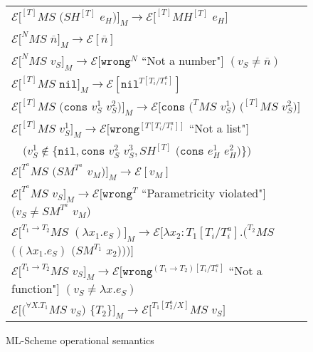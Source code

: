 \begin{figure}[p]
\centering
\begin{tabular}{l}
$\mathscr{E}[^{[T]}MS$ $(SH^{[T]}$ $e_{H})]_{M}\rightarrow\mathscr{E}[^{[T]}MH^{[T]}$ $e_{H}]$ \\
$\mathscr{E}[^{N}MS$ $\overline{n}]_{M}\rightarrow\mathscr{E}[\overline{n}]$ \\
$\mathscr{E}[^{N}MS$ $v_{S}]_{M}\rightarrow\mathscr{E}[\mathtt{wrong}^{N}$ ``Not a number"$]$ $(v_{S}\neq\overline{n})$ \\
$\mathscr{E}[^{[T]}MS$ $\mathtt{nil}]_{M}\rightarrow\mathscr{E}[\mathtt{nil}^{T[T_{i}/T_{i}^{a}]}]$ \\
$\mathscr{E}[^{[T]}MS$ $(\mathtt{cons}$ $v_{S}^{1}$ $v_{S}^{2})]_{M}\rightarrow\mathscr{E}[\mathtt{cons}$ $(^{T}MS$ $v_{S}^{1})$ $(^{[T]}MS$ $v_{S}^{2})]$ \\
$\mathscr{E}[^{[T]}MS$ $v_{S}^{1}]_{M}\rightarrow\mathscr{E}[\mathtt{wrong}^{[T[T_{i}/T_{i}^{a}]]}$ ``Not a list"$]$ \\
$\quad(v_{S}^{1}\not\in\lbrace\mathtt{nil},\mathtt{cons}$ $v_{S}^{2}$ $v_{S}^{3},SH^{[T]}$ $(\mathtt{cons}$ $e_{H}^{1}$ $e_{H}^{2})\rbrace)$ \\
$\mathscr{E}[^{T^{a}}MS$ $(SM^{T^{a}}$ $v_{M})]_{M}\rightarrow\mathscr{E}[v_{M}]$ \\
$\mathscr{E}[^{T^{a}}MS$ $v_{S}]_{M}\rightarrow\mathscr{E}[\mathtt{wrong}^{T}$ ``Parametricity violated"$]$ $(v_{S}\neq SM^{T^{a}}$ $v_{M})$ \\
$\mathscr{E}[^{T_{1}\rightarrow T_{2}}MS$ $(\lambda x_{1}.e_{S})]_{M}\rightarrow\mathscr{E}[\lambda x_{2}:T_{1}[T_{i}/T^{a}_{i}].(^{T_{2}}MS$ $((\lambda x_{1}.e_{S})$ $(SM^{T_{1}}$ $x_{2})))]$ \\
$\mathscr{E}[^{T_{1}\rightarrow T_{2}}MS$ $v_{S}]_{M}\rightarrow\mathscr{E}[\mathtt{wrong}^{(T_{1}\rightarrow T_{2})[T_{i}/T_{i}^{a}]}$ ``Not a function"$]$ $(v_{S}\neq\lambda x.e_{S})$ \\
$\mathscr{E}[(^{\forall X.T_{1}}MS$ $v_{S})$ $\lbrace T_{2}\rbrace]_{M}\rightarrow\mathscr{E}[^{T_{1}[T^{a}_{2}/X]}MS$ $v_{S}]$
\end{tabular}
\caption{ML-Scheme operational semantics}
\label{msos}
\end{figure}